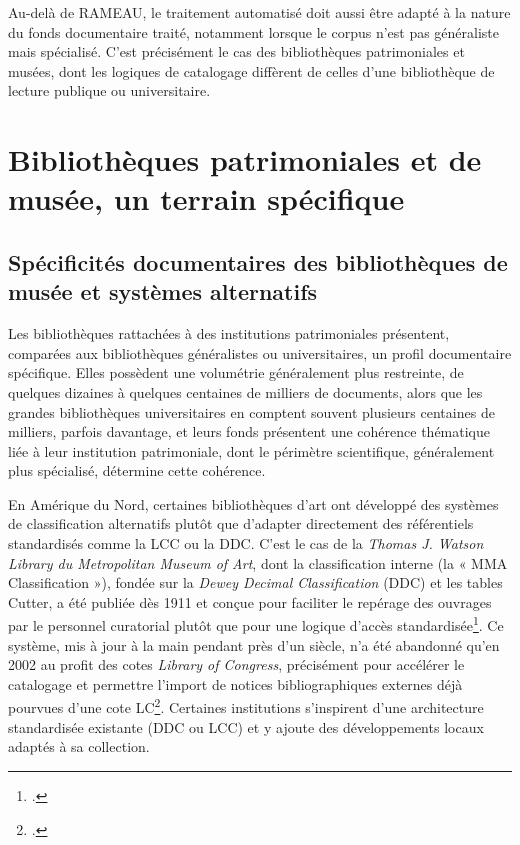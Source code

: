 Au-delà de RAMEAU, le traitement automatisé doit aussi être adapté à la nature du fonds documentaire traité, notamment lorsque le corpus n'est pas généraliste mais spécialisé. C'est précisément le cas des bibliothèques patrimoniales et musées, dont les logiques de catalogage diffèrent de celles d'une bibliothèque de lecture publique ou universitaire.


\section{Bibliothèques patrimoniales et de musée, un terrain spécifique}
\label{sec:bibliotheques-patrimoniales}

\subsection{Spécificités documentaires des bibliothèques de musée et systèmes alternatifs}
\label{sec:bibliotheques-specificites}

Les bibliothèques rattachées à des institutions patrimoniales présentent, comparées aux bibliothèques généralistes ou universitaires, un profil documentaire spécifique. Elles possèdent une volumétrie généralement plus restreinte, de quelques dizaines à quelques centaines de milliers de documents, alors que les grandes bibliothèques universitaires en comptent souvent plusieurs centaines de milliers, parfois davantage, et leurs fonds présentent une cohérence thématique liée à leur institution patrimoniale, dont le périmètre scientifique, généralement plus spécialisé, détermine cette cohérence.


En Amérique du Nord, certaines bibliothèques d'art ont développé des systèmes de classification alternatifs plutôt que d'adapter directement des référentiels standardisés comme la LCC ou la DDC. C'est le cas de la \textit{Thomas J. Watson Library du Metropolitan Museum of Art}, dont la classification interne (la « MMA Classification »), fondée sur la \textit{Dewey Decimal Classification} (DDC) et les tables Cutter, a été publiée dès 1911 et conçue pour faciliter le repérage des ouvrages par le personnel curatorial plutôt que pour une logique d'accès standardisée\footcite{fultz2020}. Ce système, mis à jour à la main pendant près d'un siècle, n'a été abandonné qu'en 2002 au profit des cotes \textit{Library of Congress}, précisément pour accélérer le catalogage et permettre l'import de notices bibliographiques externes déjà pourvues d'une cote LC\footcite{fultz2020}. Certaines institutions s'inspirent d'une architecture standardisée existante (DDC ou LCC) et y ajoute des développements locaux adaptés à sa collection.

